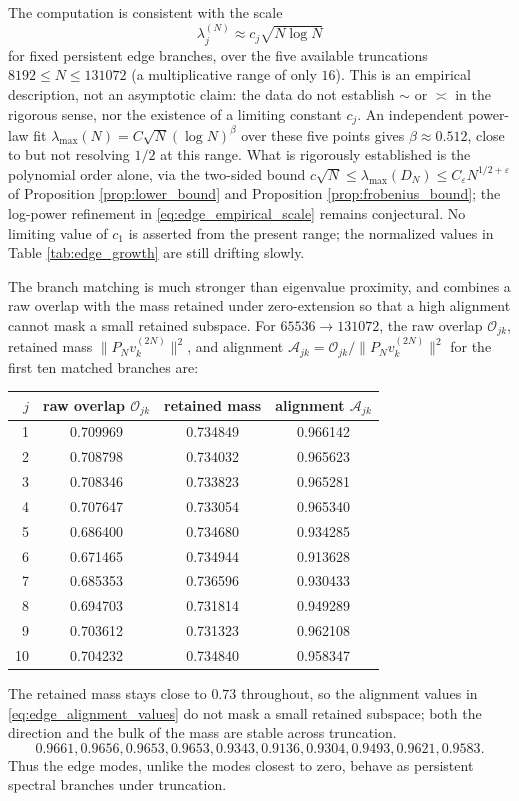 \documentclass[11pt]{amsart}
\numberwithin{equation}{section}
\theoremstyle{plain}
\theoremstyle{definition}
\theoremstyle{remark}
\newcommand{\eps}{\varepsilon}
\begin{document}
The computation is consistent with the scale
\begin{equation}
\lambda_j^{(N)}\approx c_j\sqrt{N\log N}
\label{eq:edge_empirical_scale}
\end{equation}
for fixed persistent edge branches, over the five available truncations $8192\le N\le131072$ (a multiplicative range of only $16$).  This is an empirical description, not an asymptotic claim: the data do not establish $\sim$ or $\asymp$ in the rigorous sense, nor the existence of a limiting constant $c_j$.  An independent power-law fit $\lambda_{\max}(N)=C\sqrt N(\log N)^\beta$ over these five points gives $\beta\approx0.512$, close to but not resolving $1/2$ at this range.  What is rigorously established is the polynomial order alone, via the two-sided bound $c\sqrt N\le\lambda_{\max}(D_N)\le C_\eps N^{1/2+\eps}$ of Proposition \ref{prop:lower_bound} and Proposition \ref{prop:frobenius_bound}; the log-power refinement in \eqref{eq:edge_empirical_scale} remains conjectural.  No limiting value of $c_1$ is asserted from the present range; the normalized values in Table \ref{tab:edge_growth} are still drifting slowly.

The branch matching is much stronger than eigenvalue proximity, and combines a raw overlap with the mass retained under zero-extension so that a high alignment cannot mask a small retained subspace.  For $65536\to131072$, the raw overlap $\mathcal O_{jk}$, retained mass $\|P_Nv_k^{(2N)}\|^2$, and alignment $\mathcal A_{jk}=\mathcal O_{jk}/\|P_Nv_k^{(2N)}\|^2$ for the first ten matched branches are:
\begin{center}
\begin{tabular}{rccc}
\toprule
$j$ & raw overlap $\mathcal O_{jk}$ & retained mass & alignment $\mathcal A_{jk}$\\
\midrule
1 & 0.709969 & 0.734849 & 0.966142\\
2 & 0.708798 & 0.734032 & 0.965623\\
3 & 0.708346 & 0.733823 & 0.965281\\
4 & 0.707647 & 0.733054 & 0.965340\\
5 & 0.686400 & 0.734680 & 0.934285\\
6 & 0.671465 & 0.734944 & 0.913628\\
7 & 0.685353 & 0.736596 & 0.930433\\
8 & 0.694703 & 0.731814 & 0.949289\\
9 & 0.703612 & 0.731323 & 0.962108\\
10 & 0.704232 & 0.734840 & 0.958347\\
\bottomrule
\end{tabular}
\end{center}
The retained mass stays close to $0.73$ throughout, so the alignment values in \eqref{eq:edge_alignment_values} do not mask a small retained subspace; both the direction and the bulk of the mass are stable across truncation.
\begin{equation}
0.9661,
0.9656,
0.9653,
0.9653,
0.9343,
0.9136,
0.9304,
0.9493,
0.9621,
0.9583.
\label{eq:edge_alignment_values}
\end{equation}
Thus the edge modes, unlike the modes closest to zero, behave as persistent spectral branches under truncation.
\end{document}
